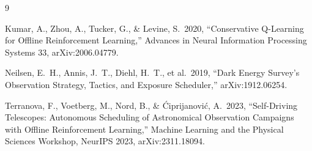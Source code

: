\documentclass[11pt]{article}
\begin{document}
\begin{thebibliography}{9}

Kumar, A., Zhou, A., Tucker, G., \& Levine, S.\ 2020,
``Conservative Q-Learning for Offline Reinforcement Learning,''
Advances in Neural Information Processing Systems 33,
arXiv:2006.04779.

Neilsen, E.~H., Annis, J.~T., Diehl, H.~T., et al.\ 2019,
``Dark Energy Survey's Observation Strategy, Tactics, and Exposure Scheduler,''
arXiv:1912.06254.

Terranova, F., Voetberg, M., Nord, B., \& \'Ciprijanovi\'c, A.\ 2023,
``Self-Driving Telescopes: Autonomous Scheduling of Astronomical Observation
Campaigns with Offline Reinforcement Learning,''
Machine Learning and the Physical Sciences Workshop, NeurIPS 2023,
arXiv:2311.18094.

\end{thebibliography}
\end{document}
